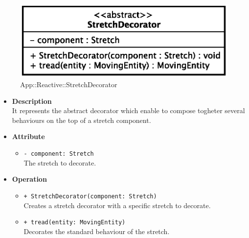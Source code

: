 \begin{figure}[h]
\centering
\includegraphics[scale=0.6,keepaspectratio]{images/solution/stretch_decorator.eps}
\caption{App::Reactive::StretchDecorator}
\label{fig:sd-app-stretch_decorator}
\end{figure}
\FloatBarrier
\begin{itemize}
  \item \textbf{Description} \\
    It represents the abstract decorator which enable to compose togheter several
behaviours on the top of a stretch component. 
  \item \textbf{Attribute}
  \begin{itemize}
    \item \texttt{- component: Stretch} \\
The stretch to decorate.
  \end{itemize}
  \item \textbf{Operation}
   \begin{itemize} 
   \item \texttt{+ StretchDecorator(component: Stretch)} \\
Creates a stretch decorator with a specific stretch to decorate.
    \item \texttt{+ tread(entity: MovingEntity)} \\
Decorates the standard behaviour of the stretch.  
  \end{itemize}
\end{itemize}
